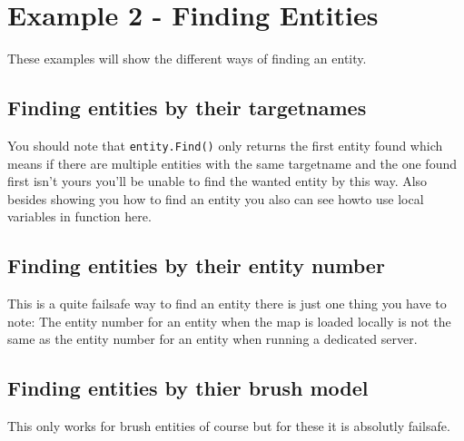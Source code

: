 \documentclass{scrreprt}
\begin{document}
\section{Example 2 - Finding Entities}
\label{example2}
These examples will show the different ways of finding an entity.
\subsection{Finding entities by their targetnames}
\label{example21}

You should note that \lstinline|entity.Find()| only returns the first entity found which means if there are multiple entities with the same targetname and the one found first isn't yours you'll be unable to find the wanted entity by this way.
\newline
Also besides showing you how to find an entity you also can see howto use local variables in function here.
\subsection{Finding entities by their entity number}
\label{example22}

This is a quite failsafe way to find an entity there is just one thing you have to note: The entity number for an entity when the map is loaded locally is not the same as the entity number for an entity when running a dedicated server.
\subsection{Finding entities by thier brush model}
\label{example23}

This only works for brush entities of course but for these it is absolutly failsafe.
\end{document}
